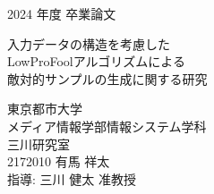 
\begin{center}
    \vspace*{5cm} %

    {\Large 2024 年度 卒業論文} %
    \vspace{3cm}

    {\LARGE 入力データの構造を考慮した\\LowProFoolアルゴリズムによる\\敵対的サンプルの生成に関する研究} %
    \vspace{2cm}

    \begin{flushright}
        {\large 東京都市大学} \\
        {\large メディア情報学部情報システム学科} \\
        {\large 三川研究室} \\
        {\large 2172010 有馬 祥太} \\
        {\large 指導: 三川 健太 准教授} \\
    \end{flushright}

\end{center}
